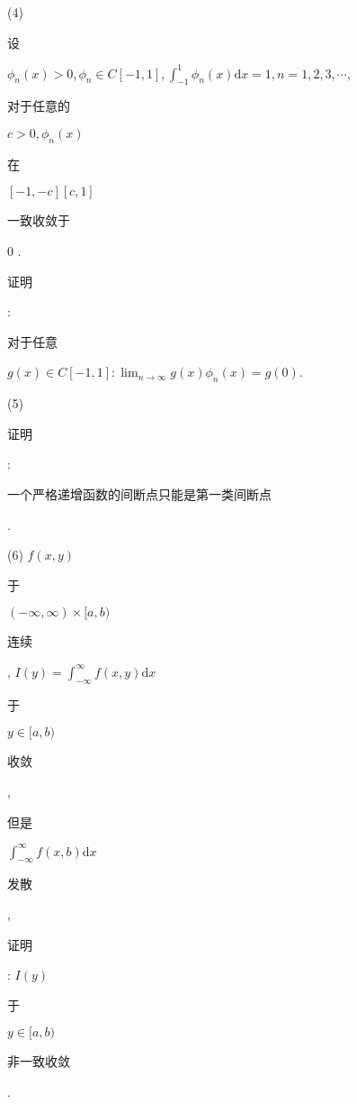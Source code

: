 \documentclass[10pt]{article}
\begin{document}
(4) \begin{CJK}{UTF8}{mj}设\end{CJK} $\phi_{n}(x)>0, \phi_{n} \in C[-1,1], \int_{-1}^{1} \phi_{n}(x) \mathrm{d} x=1, n=1,2,3, \cdots$, \begin{CJK}{UTF8}{mj}对于任意的\end{CJK} $c>0, \phi_{n}(x)$ \begin{CJK}{UTF8}{mj}在\end{CJK} $[-1,-c][c, 1]$ \begin{CJK}{UTF8}{mj}一致收敛于\end{CJK} 0 . \begin{CJK}{UTF8}{mj}证明\end{CJK}: \begin{CJK}{UTF8}{mj}对于任意\end{CJK} $g(x) \in C[-1,1]: \lim _{n \rightarrow \infty} g(x) \phi_{n}(x)=g(0)$.

(5) \begin{CJK}{UTF8}{mj}证明\end{CJK}: \begin{CJK}{UTF8}{mj}一个严格递增函数的间断点只能是第一类间断点\end{CJK}.

(6) $f(x, y)$ \begin{CJK}{UTF8}{mj}于\end{CJK} $(-\infty, \infty) \times[a, b)$ \begin{CJK}{UTF8}{mj}连续\end{CJK}, $I(y)=\int_{-\infty}^{\infty} f(x, y) \mathrm{d} x$ \begin{CJK}{UTF8}{mj}于\end{CJK} $y \in[a, b)$ \begin{CJK}{UTF8}{mj}收敛\end{CJK}, \begin{CJK}{UTF8}{mj}但是\end{CJK} $\int_{-\infty}^{\infty} f(x, b) \mathrm{d} x$ \begin{CJK}{UTF8}{mj}发散\end{CJK}, \begin{CJK}{UTF8}{mj}证明\end{CJK}: $I(y)$ \begin{CJK}{UTF8}{mj}于\end{CJK} $y \in[a, b)$ \begin{CJK}{UTF8}{mj}非一致收敛\end{CJK}.
\end{document}
